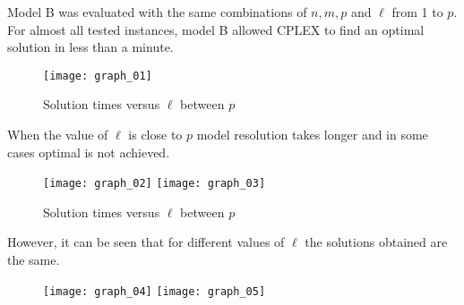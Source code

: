 Model B was evaluated
with the same combinations of $n,m,p$
and $\ell$ from 1 to $p$.
For almost all tested instances,
model B allowed CPLEX to find an optimal solution
in less than a minute.
\begin{figure}[!ht]
  \centering
  \texttt{[image: graph\_01]}
  \caption{Solution times versus $\ell$ between $p$}
\end{figure}

When the value of $\ell$ 
is close to $p$
model resolution takes longer
and in some cases
optimal is not achieved.
\begin{figure}[!ht]
  \centering
  \texttt{[image: graph\_02]}
  \texttt{[image: graph\_03]}
  \caption{Solution times versus $\ell$ between $p$}
\end{figure}

However,
it can be seen
that for different values of $\ell$
the solutions obtained are the same.

\begin{figure}[!ht]
  \centering
  \texttt{[image: graph\_04]}
  \texttt{[image: graph\_05]}
\end{figure}
